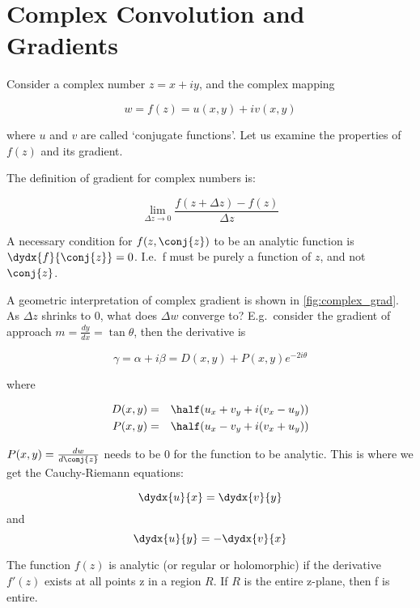\def \path {misc/dtcwt_proofs}
\def \imgpath {\path/images}

\section{Complex Convolution and Gradients}

Consider a complex number $z=x+iy$, and the complex mapping 

$$w=f(z) = u(x,y) + iv(x,y)$$ 

where $u$ and $v$ are called `conjugate functions'. Let us examine the
properties of $f(z)$ and its gradient. 

The definition of gradient for complex numbers is:

$$ \lim_{\Delta z\to 0} \frac{f(z + \Delta z) - f(z)}{\Delta z}$$

A necessary condition for $f(z,\conj{z})$ to be an analytic function is
$\dydx{f}{\conj{z}}=0$. I.e.\ f must be purely a function of $z$, and not
$\conj{z}$.

A geometric interpretation of complex gradient is shown in
\autoref{fig:complex_grad}.  As $\Delta z$ shrinks to 0, what does $\Delta w$
converge to? E.g.\ consider the gradient of approach $m=\frac{dy}{dx}=\tan
\theta$, then the derivative is

$$\gamma = \alpha + i\beta = D(x,y) + P(x,y)e^{-2i\theta}$$

where

\begin{eqnarray*}
  D(x,y) & = & \half(u_x + v_y + i(v_x - u_y)) \\
  P(x,y) & = & \half(u_x - v_y + i(v_x + u_y))
\end{eqnarray*}

$P(x,y)=\frac{dw}{d\conj{z}}$ needs to be 0 for the function to be analytic.
This is where we get the Cauchy-Riemann equations:

$$\dydx{u}{x}= \dydx{v}{y}$$ 
and 
$$\dydx{u}{y}= -\dydx{v}{x}$$ 

The function $f(z)$ is analytic (or regular or holomorphic) if the derivative 
$f'(z)$ exists at all points z in a region $R$. If $R$ is the entire z-plane,
then f is entire. 

\begin{figure}[!h]
	\centering
  
  \label{fig:complex_grad}
\end{figure}





